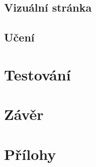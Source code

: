 \section{Vizuální stránka}
\section{Učení}



\chapter{Testování}
\label{testovani}
\chapter{Závěr}
\label{zaver}
\chapter{Přílohy}
\label{prilohy}




%
